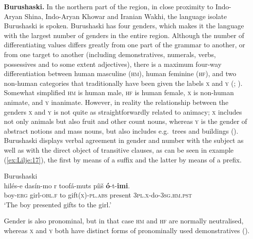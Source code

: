 \documentclass[output=collectionpaper]{langsci/langscibook}
\begin{document}
\textbf{Burushaski.} In the northern part of the region, in close proximity to Indo-Aryan Shina, Indo-Aryan Khowar and Iranian Wakhi, the language isolate Burushaski is spoken. Burushaski has four genders, which makes it the language with the largest number of genders in the entire region. Although the number of differentiating values differs greatly from one part of the grammar  to another, or from one target to another (including demonstratives, numerals, verbs, possessives and to some extent adjectives), there is a maximum four-way differentiation between human masculine (\textsc{hm}), human feminine (\textsc{hf}), and two non-human categories that traditionally have been given the labels \textsc{x} and \textsc{y} (\citealt[8--9]{Willson1996}; \citealt[33--34]{Berger1998}). Somewhat simplified \textsc{hm} is human male, \textsc{hf} is human female, \textsc{x} is non-human animate, and \textsc{y} inanimate. However, in reality the relationship between the genders \textsc{x} and \textsc{y} is not quite as straightforwardly related to animacy; \textsc{x} includes not only animals but also fruit and other count nouns, whereas \textsc{y} is the gender of abstract notions and mass nouns, but also includes e.g.\ trees and buildings (\citealt[32--33]{Yoshioka2012}). Burushaski displays verbal agreement in gender and number with the subject as well as with the direct object of transitive clauses, as can be seen in example (\ref{ex:Lilje:17}), the first by means of a suffix and the latter by means of a prefix.

\ea
\label{ex:Lilje:17}
Burushaski \citep[17]{Willson1996}\\
\gll hilés-e dasín-mo r toofá-muts píiš \textbf{ó}{}-t-\textbf{imi}.   \\
boy-\textsc{erg} girl-\textsc{obl.f} to gift\textsc{(x)-pl.abs} present \textsc{3pl.x}{}-do-\textsc{3sg.hm.pst}   \\
\glt `The boy presented gifts to the girl.'
\z

Gender is also pronominal, but in that case \textsc{hm} and \textsc{hf} are normally neutralised, whereas \textsc{x} and \textsc{y} both have distinct forms of pronominally used demonstratives (\citealt[81--82]{Berger1998}).
\end{document}
